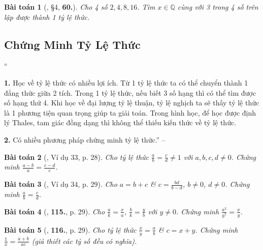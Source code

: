 \documentclass{article}
\numberwithin{equation}{section}
\newtheorem{baitoan}{Bài toán}
\begin{document}
\begin{baitoan}[\cite{Binh_Toan_7_tap_1}, \S4, \textbf{60.}]
	Cho 4 số $2,4,8,16$. Tìm $x\in\mathbb{Q}$ cùng với 3 trong 4 số trên lập được thành 1 tỷ lệ thức.
\end{baitoan}


\subsection{Chứng Minh Tỷ Lệ Thức}
``\begin{enumerate*}
	\item[\textbf{1.}] Học về tỷ lệ thức có nhiều lợi ích. Từ 1 tỷ lệ thức ta có thể chuyển thành 1 đẳng thức giữa 2 tích. Trong 1 tỷ lệ thức, nếu biết 3 số hạng thì có thể tìm được số hạng thứ 4. Khi học về đại lượng tỷ lệ thuận, tỷ lệ nghịch ta sẽ thấy tỷ lệ thức là 1 phương tiện quan trọng giúp ta giải toán. Trong hình học, để học được định lý Thales, tam giác đồng dạng thì không thể thiếu kiến thức về tỷ lệ thức.
	\item[\textbf{2.}] Có nhiều phương pháp chứng minh tỷ lệ thức.'' -- \cite[Chap. 2, \S6, p. 28]{Tuyen_Toan_7}
\end{enumerate*}

\begin{baitoan}[\cite{Tuyen_Toan_7}, Ví dụ 33, p. 28]
	Cho tỷ lệ thức $\frac{a}{b} = \frac{c}{d}\ne 1$ với $a,b,c,d\ne 0$. Chứng minh $\frac{a - b}{a} = \frac{c - d}{c}$.
\end{baitoan}

\begin{baitoan}[\cite{Tuyen_Toan_7}, Ví dụ 34, p. 29]
	Cho $a = b + c$ \& $c = \frac{bd}{b - d}$, $b\ne 0$, $d\ne 0$. Chứng minh $\frac{a}{b} = \frac{c}{d}$.
\end{baitoan}

\begin{baitoan}[\cite{Tuyen_Toan_7}, \textbf{115.}, p. 29]
	Cho $\frac{a}{k} = \frac{x}{a}$, $\frac{b}{k} = \frac{y}{b}$ với $y\ne 0$. Chứng minh $\frac{a^2}{b^2} = \frac{x}{y}$.
\end{baitoan}

\begin{baitoan}[\cite{Tuyen_Toan_7}, \textbf{116.}, p. 29]
	Cho tỷ lệ thức $\frac{x}{y} = \frac{a}{b}$ \& $c = x + y$. Chứng minh $\frac{1}{x} = \frac{a + b}{ac}$ (giả thiết các tỷ số đều có nghĩa).
\end{baitoan}
\end{document}
